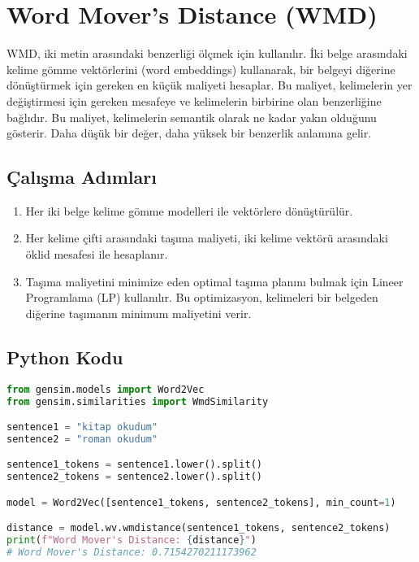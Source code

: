 \section{Word Mover's Distance (WMD)}

WMD, iki metin arasındaki benzerliği ölçmek için kullanılır. İki belge arasındaki kelime gömme vektörlerini (word embeddings) kullanarak, bir belgeyi diğerine dönüştürmek için gereken en küçük maliyeti hesaplar. Bu maliyet, kelimelerin yer değiştirmesi için gereken mesafeye ve kelimelerin birbirine olan benzerliğine bağlıdır. Bu maliyet, kelimelerin semantik olarak ne kadar yakın olduğunu gösterir. Daha düşük bir değer, daha yüksek bir benzerlik anlamına gelir.

\subsection{Çalışma Adımları}

\begin{enumerate}
    \item Her iki belge kelime gömme modelleri ile vektörlere dönüştürülür.
    \item Her kelime çifti arasındaki taşıma maliyeti, iki kelime vektörü arasındaki öklid mesafesi ile hesaplanır.
    \item Taşıma maliyetini minimize eden optimal taşıma planını bulmak için Lineer Programlama (LP) kullanılır. Bu optimizasyon, kelimeleri bir belgeden diğerine taşımanın minimum maliyetini verir.
\end{enumerate}

\subsection{Python Kodu}

\begin{lstlisting}[language=Python]
from gensim.models import Word2Vec
from gensim.similarities import WmdSimilarity

sentence1 = "kitap okudum"
sentence2 = "roman okudum"

sentence1_tokens = sentence1.lower().split()
sentence2_tokens = sentence2.lower().split()

model = Word2Vec([sentence1_tokens, sentence2_tokens], min_count=1)

distance = model.wv.wmdistance(sentence1_tokens, sentence2_tokens)
print(f"Word Mover's Distance: {distance}")
# Word Mover's Distance: 0.7154270211173962
\end{lstlisting}

\newpage
